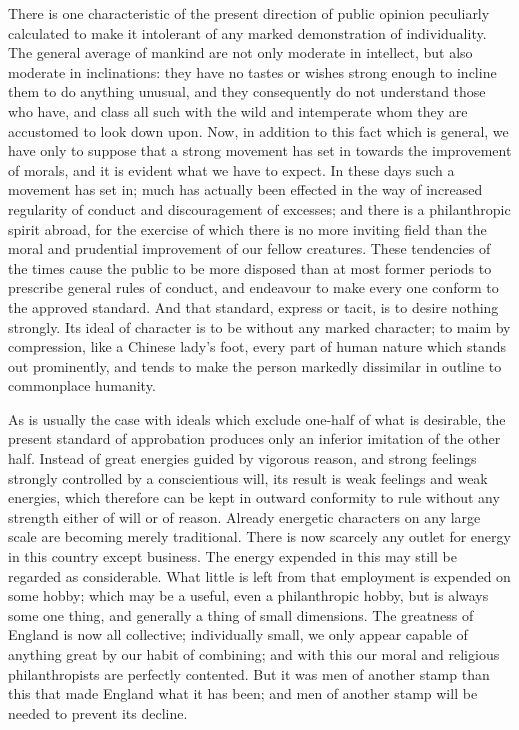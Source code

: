 \documentclass[11pt,openany]{book}
\begin{document}
There is one characteristic of the present direction of public opinion peculiarly calculated to make it intolerant of any marked demonstration of individuality. The general average of mankind are not only moderate in intellect, but also moderate in inclinations: they have no tastes or wishes strong enough to incline them to do anything unusual, and they consequently do not understand those who have, and class all such with the wild and intemperate whom they are accustomed to look down upon. Now, in addition to this fact which is general, we have only to suppose that a strong movement has set in towards the improvement of morals, and it is evident what we have to expect. In these days such a movement has set in; much has actually been effected in the way of increased regularity of conduct and discouragement of excesses; and there is a philanthropic spirit abroad, for the exercise of which there is no more inviting field than the moral and prudential improvement of our fellow creatures. These tendencies of the times cause the public to be more disposed than at most former periods to prescribe general rules of conduct, and endeavour to make every one conform to the approved standard. And that standard, express or tacit, is to desire nothing strongly. Its ideal of character is to be without any marked character; to maim by compression, like a Chinese lady's foot, every part of human nature which stands out prominently, and tends to make the person markedly dissimilar in outline to commonplace humanity.

As is usually the case with ideals which exclude one-half of what is desirable, the present standard of approbation produces only an inferior imitation of the other half. Instead of great energies guided by vigorous reason, and strong feelings strongly controlled by a conscientious will, its result is weak feelings and weak energies, which therefore can be kept in outward conformity to rule without any strength either of will or of reason. Already energetic characters on any large scale are becoming merely traditional. There is now scarcely any outlet for energy in this country except business. The energy expended in this may still be regarded as considerable. What little is left from that employment is expended on some hobby; which may be a useful, even a philanthropic hobby, but is always some one thing, and generally a thing of small dimensions. The greatness of England is now all collective; individually small, we only appear capable of anything great by our habit of combining; and with this our moral and religious philanthropists are perfectly contented. But it was men of another stamp than this that made England what it has been; and men of another stamp will be needed to prevent its decline.
\end{document}
